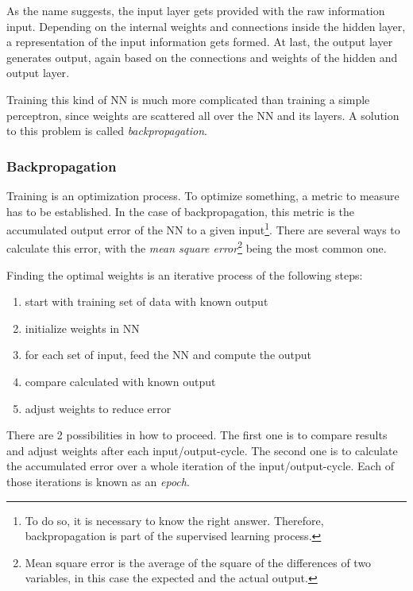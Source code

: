 As the name suggests, the input layer gets provided with the raw information input. Depending on the internal weights and connections inside the hidden layer, a representation of the input information gets formed. At last, the output layer generates output, again based on the connections and weights of the hidden and output layer\cite{Stergiou96}.

Training this kind of NN is much more complicated than training a simple perceptron, since weights are scattered all over the NN and its layers. A solution to this problem is called \emph{backpropagation}\cite{Shiffman12}.


\subsubsection{Backpropagation}
Training is an optimization process. To optimize something, a metric to measure has to be established. In the case of backpropagation, this metric is the accumulated output error of the NN to a given input\footnote{To do so, it is necessary to know the right answer. Therefore, backpropagation is part of the supervised learning process.}. There are several ways to calculate this error, with the \emph{mean square error}\footnote{Mean square error is the average of the square of the differences of two variables, in this case the expected and the actual output.} being the most common one\cite{Bourg04}.

Finding the optimal weights is an iterative process of the following steps:
\begin{enumerate}
	\item start with training set of data with known output
	\item initialize weights in NN
	\item for each set of input, feed the NN and compute the output
	\item compare calculated with known output
	\item adjust weights to reduce error
\end{enumerate}

There are 2 possibilities in how to proceed. The first one is to compare results and adjust weights after each input/output-cycle. The second one is to calculate the accumulated error over a whole iteration of the input/output-cycle. Each of those iterations is known as an \emph{epoch}\cite{Bourg04}.


